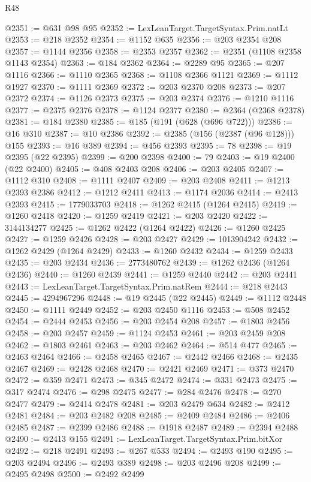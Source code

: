 \begin{lexlean}{R48}
\begin{coremodule}
@2351 := @631 @98 @95
@2352 := LexLeanTarget.TargetSyntax.Prim.natLt
@2353 := @218 @2352
@2354 := @1152 @635
@2356 := @203 @2354 @208
@2357 := @1144 @2356
@2358 := @2353 @2357
@2362 := @2351 (@1108 @2358 @1143 @2354)
@2363 := @184 @2362
@2364 := @2289 @95
@2365 := @207 @1116
@2366 := @1110 @2365
@2368 := @1108 @2366 @1121
@2369 := @1112 @1927
@2370 := @1111 @2369
@2372 := @203 @2370 @208
@2373 := @207 @2372
@2374 := @1126 @2373
@2375 := @203 @2374
@2376 := @1210 @1116
@2377 := @2375 @2376
@2378 := @1124 @2377
@2380 := @2364 (@2368 @2378)
@2381 := @184 @2380
@2385 := @185 (@191 (@628 (@696 @722)))
@2386 := @16 @310
@2387 := @10 @2386
@2392 := @2385 (@156 (@2387 (@96 @128))) @155
@2393 := @16 @389
@2394 := @456 @2393
@2395 := 78
@2398 := @19 @2395 (@22 @2395)
@2399 := @200 @2398
@2400 := 79
@2403 := @19 @2400 (@22 @2400)
@2405 := @408 @2403 @208
@2406 := @203 @2405
@2407 := @1112 @310
@2408 := @1111 @2407
@2409 := @203 @2408
@2411 := @1213 @2393 @2386
@2412 := @1212 @2411
@2413 := @1174 @2036
@2414 := @2413 @2393
@2415 := 1779033703
@2418 := @1262 @2415 (@1264 @2415)
@2419 := @1260 @2418
@2420 := @1259 @2419
@2421 := @203 @2420
@2422 := 3144134277
@2425 := @1262 @2422 (@1264 @2422)
@2426 := @1260 @2425
@2427 := @1259 @2426
@2428 := @203 @2427
@2429 := 1013904242
@2432 := @1262 @2429 (@1264 @2429)
@2433 := @1260 @2432
@2434 := @1259 @2433
@2435 := @203 @2434
@2436 := 2773480762
@2439 := @1262 @2436 (@1264 @2436)
@2440 := @1260 @2439
@2441 := @1259 @2440
@2442 := @203 @2441
@2443 := LexLeanTarget.TargetSyntax.Prim.natRem
@2444 := @218 @2443
@2445 := 4294967296
@2448 := @19 @2445 (@22 @2445)
@2449 := @1112 @2448
@2450 := @1111 @2449
@2452 := @203 @2450 @1116
@2453 := @508 @2452
@2454 := @2444 @2453
@2456 := @203 @2454 @208
@2457 := @1803 @2456
@2458 := @203 @2457
@2459 := @1124 @2453
@2461 := @203 @2459 @208
@2462 := @1803 @2461
@2463 := @203 @2462
@2464 := @514 @477
@2465 := @2463 @2464
@2466 := @2458 @2465
@2467 := @2442 @2466
@2468 := @2435 @2467
@2469 := @2428 @2468
@2470 := @2421 @2469
@2471 := @373 @2470
@2472 := @359 @2471
@2473 := @345 @2472
@2474 := @331 @2473
@2475 := @317 @2474
@2476 := @298 @2475
@2477 := @284 @2476
@2478 := @270 @2477
@2479 := @2414 @2478
@2481 := @203 @2479 @634
@2482 := @2412 @2481
@2484 := @203 @2482 @208
@2485 := @2409 @2484
@2486 := @2406 @2485
@2487 := @2399 @2486
@2488 := @1918 @2487
@2489 := @2394 @2488
@2490 := @2413 @155
@2491 := LexLeanTarget.TargetSyntax.Prim.bitXor
@2492 := @218 @2491
@2493 := @267 @533
@2494 := @2493 @190
@2495 := @203 @2494
@2496 := @2493 @389
@2498 := @203 @2496 @208
@2499 := @2495 @2498
@2500 := @2492 @2499

\end{coremodule}
\end{lexlean}
